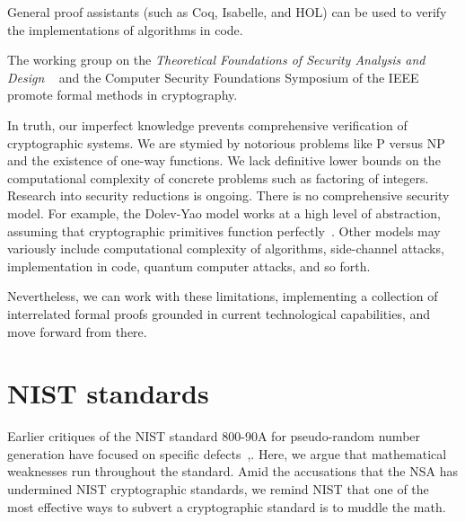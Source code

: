 \documentclass[11pt]{amsart} %
\begin{document}
General proof assistants  (such as Coq, Isabelle, and HOL) can be used to verify  the implementations of algorithms in code.


The working group on the {\it Theoretical Foundations of Security
Analysis and Design}
~\cite{TFSAD}
and the Computer Security Foundations Symposium of the IEEE~\cite{CSF2013} promote formal methods in cryptography.

In truth, our imperfect knowledge prevents
comprehensive verification of cryptographic systems.
We are stymied by notorious problems like
P versus NP  and the existence of one-way functions.  
We lack definitive lower bounds on the computational complexity of concrete problems such as
factoring of integers.
Research into security reductions is ongoing.  
There is no comprehensive security model.  
For example, the Dolev-Yao model works at a high level of abstraction, assuming that cryptographic primitives function perfectly~\cite{DY}.
Other models may variously include computational complexity of algorithms,
side-channel attacks, implementation in code, quantum computer attacks, and so forth.

Nevertheless, we can work with these limitations, implementing a collection of interrelated formal proofs
grounded in current technological capabilities, and move forward from there.


\section{NIST standards}

Earlier critiques of the NIST standard 800-90A for pseudo-random number
generation have focused on specific
defects~\cite{Green-EC},\cite{2006-190}.  Here, we argue that 
mathematical weaknesses run throughout the standard.  Amid the accusations that the NSA has undermined NIST
cryptographic standards, we remind NIST that one of the most effective ways to subvert a cryptographic standard is to 
muddle the math.
\end{document}
